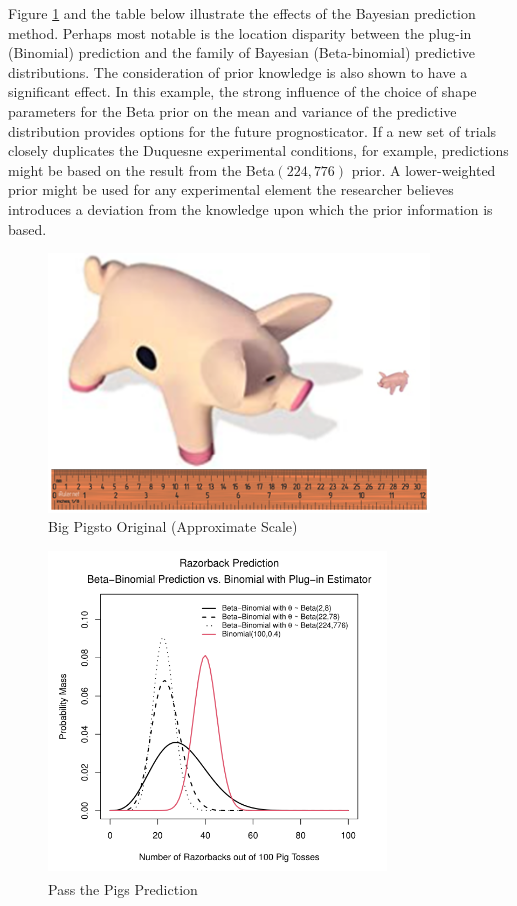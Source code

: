 \documentclass[12pt, a4paper]{article}
\begin{document}
\noindent Figure \ref{fig:PtPBB} and the table below illustrate the effects of the Bayesian prediction method. Perhaps most notable is the location disparity between the plug-in (Binomial) prediction and the family of Bayesian (Beta-binomial) predictive distributions.  The consideration of prior knowledge is also shown to have a significant effect.  In this example, the strong influence of the choice of shape parameters for the Beta prior on the mean and variance of the predictive distribution provides options for the future prognosticator. If a new set of trials closely duplicates the Duquesne experimental conditions, for example, predictions might be based on the result from the Beta$(224,776)$ prior.  A lower-weighted prior might be used for any experimental element the researcher believes introduces a deviation from the knowledge upon which the prior information is based.

\begin{figure}[h]
  \centering
  \includegraphics[width=0.9\textwidth]{./Graphics/PassThePigs/PigSize_wRuler}
  \caption{Big Pigs\texttrademark to Original (Approximate Scale)}
\end{figure}


\vspace{1cm}

\begin{figure}[ht]
  \centering
  \includegraphics[width=0.8\textwidth]{./Graphics/PassThePigs/PTP_BBplot}
  \caption{Pass the Pigs\textsuperscript{\circledR} Prediction}
  \label{fig:PtPBB}
\end{figure}
\end{document}
